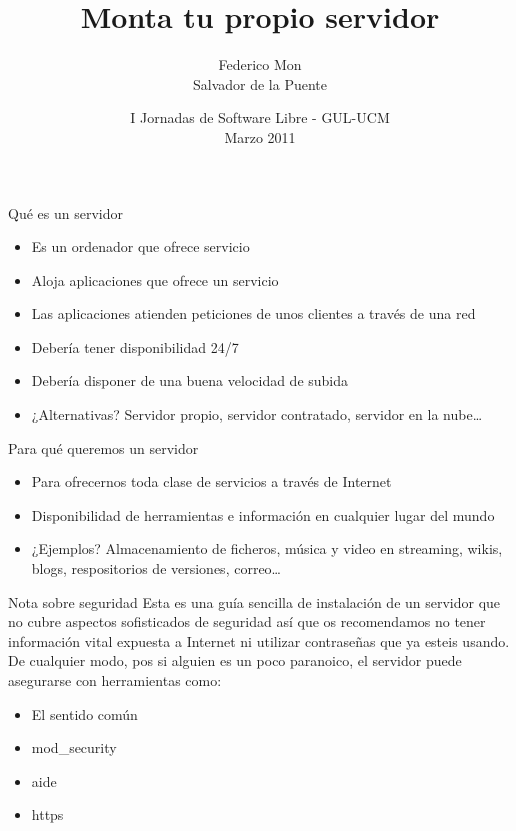 \documentclass[spanish]{beamer}
\title[Monta tu propio servidor - GUL-UCM]
{Monta tu propio servidor
}
\author[\url{http://gulucm.org}]
{
Federico Mon\\
Salvador de la Puente
}
\institute{Facultad de Informática.\\Universidad Complutense de Madrid.}
\date{
I Jornadas de Software Libre - GUL-UCM\\
Marzo 2011}
\begin{document}
\frame{\titlepage}

\begin{frame}{Qué es un servidor}
\begin{itemize}
\item Es un ordenador que ofrece servicio
\item Aloja aplicaciones que ofrece un servicio
\item Las aplicaciones atienden peticiones de unos clientes a través de una red
\item Debería tener disponibilidad 24/7
\item Debería disponer de una buena velocidad de subida
\item ¿Alternativas? Servidor propio, servidor contratado, servidor en la nube\ldots
\end{itemize}
\end{frame}

\begin{frame}{Para qué queremos un servidor}
\begin{itemize}
\item Para ofrecernos toda clase de servicios a través de Internet
\item Disponibilidad de herramientas e información en cualquier lugar del mundo
\item ¿Ejemplos? Almacenamiento de ficheros, música y video en streaming, wikis, blogs, respositorios de versiones, correo\ldots
\end{itemize}
\end{frame}

\begin{frame}{Nota sobre seguridad}
Esta es una guía sencilla de instalación de un servidor que no cubre aspectos sofisticados de seguridad así que os recomendamos no tener información vital expuesta a Internet ni utilizar contraseñas que ya esteis usando. De cualquier modo, pos si alguien es un poco paranoico, el servidor puede asegurarse con herramientas como:
\begin{itemize}
\item El sentido común
\item mod\_security
\item aide
\item https
\end{itemize}
\end{frame}
\end{document}
